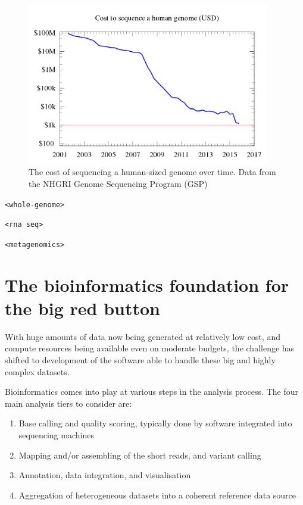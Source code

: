 \begin{figure}[h!]
    \centering
    \includegraphics[width=300pt]{chapters/images/Historic_cost_of_sequencing_a_human_genome.png}
    \caption{The cost of sequencing a human-sized genome over time. Data from the NHGRI Genome Sequencing Program (GSP) }
    \label{fig:seqcost}
\end{figure}



\verb+<whole-genome>+

\verb+<rna seq>+

\verb+<metagenomics>+

\newpage
\section{The bioinformatics foundation for the big red button}

With huge amounts of data now being generated at relatively low cost, and compute resources being available even on moderate budgets, the challenge has shifted to development of the software able to handle these big and highly complex datasets.

Bioinformatics comes into play at various steps in the analysis process. The four main analysis tiers \cite{kulski2016next} to consider are:
\begin{enumerate}
    \item Base calling and quality scoring, typically done by software integrated into sequencing machines
    \item Mapping and/or assembling of the short reads, and variant calling
    \item Annotation, data integration, and visualisation
    \item Aggregation of heterogeneous datasets into a coherent reference data source
\end{enumerate}

